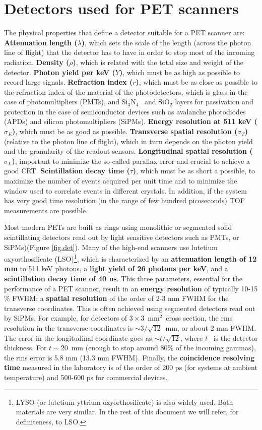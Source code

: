 \documentclass[review]{elsarticle}
\begin{document}
\section{Detectors used for PET scanners}
\label{sec.det}

The physical properties that define a detector suitable for a PET scanner are: 
{\bf Attenuation length ($\lambda$)}, which sets the scale of the length (across the photon line of flight) that the detector has to have in order to stop most of the incoming radiation.
{\bf Density ($\rho$)}, which is related with the total size and weight of the detector.
{\bf Photon yield per keV ($Y$)}, which must be as high as possible to record large signals. 
{\bf Refraction index ($r$)}, which must be as close as possible to the refraction index of the material of the photodetectors, which is glass in the case of photomultipliers (PMTs), and Si$_3$N$_4$~ and SiO$_2$ layers for passivation and protection in the case of semiconductor devices such as avalanche photodiodes (APDs) and silicon photomultipliers (SiPMs). 
{\bf Energy resolution at 511 keV ($\sigma_E$)}, which must be as good as possible. 
{\bf Transverse spatial resolution ($\sigma_T$)} (relative to the photon line of flight), which in turn depends on the photon yield and the granularity of the readout sensors.
{\bf Longitudinal spatial resolution ($\sigma_L$)}, important to minimize the so-called parallax error and crucial to achieve a good CRT.   
{\bf Scintillation decay time ($\tau$)}, which must be as short a possible, to maximize the number of events acquired per unit time and to minimize the window used to correlate events in different crystals. In addition, if the system has very good time resolution (in the range of few hundred picoseconds) TOF measurements are possible. 

Most modern PETs are built as rings using monolithic or segmented solid scintillating detectors read out by light sensitive detectors such as PMTs, or SiPMs)(Figure \ref{fig.det}). Many of the high-end scanners use lutetium oxyorthosilicate (LSO)\footnote{LYSO (or lutetium-yttrium oxyorthosilicate) is also widely used. Both materials are very similar. In the rest of this document we will refer, for definiteness, to LSO.}, which is characterized by an {\bf attenuation length of 12 mm} to 511 keV photons, a  {\bf light yield of 26 photons per keV}, and a {\bf scintillation decay time of 40 ns}. This three parameters, essential for the performance of a PET scanner, result in an {\bf energy resolution} of typically 10-15 \% FWHM; a {\bf spatial resolution} of the order of 2-3 mm FWHM for the transverse coordinates. This is often achieved using segmented detectors read out by SiPMs. For example, for detectors of $3 \times 3$~mm$^2$~cross section, the rms resolution in the transverse coordinates is $\sim 3/\sqrt{12}$~mm, or about 2 mm FWHM. The error in 
the longitudinal coordinate goes as $\sim t/\sqrt{12}$, where $t$~ is the detector thickness. For $t \sim 20$~mm (enough to stop around 80\% of the incoming gammas), the rms error is 5.8 mm (13.3 mm FWHM). Finally, the {\bf coincidence resolving time} measured in the laboratory is of the order of 200 ps (for systems at ambient temperature) and 500-600 ps for commercial devices.
\end{document}
